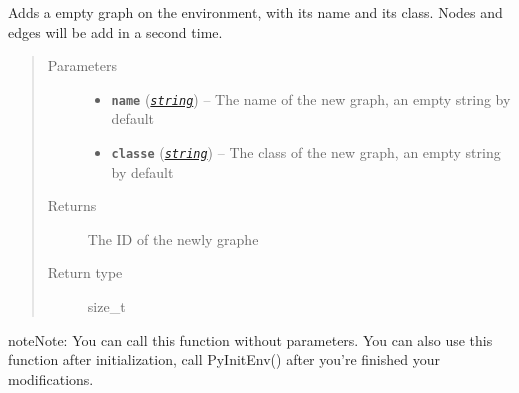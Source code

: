 \documentclass[letterpaper,10pt,english]{sphinxmanual}
\begin{document}

\begin{fulllineitems}
\label{doc:PythonGedLib.PyAddGraph}
Adds a empty graph on the environment, with its name and its class. Nodes and edges will be add in a second time.
\begin{quote}\begin{description}
\item[{Parameters}] \leavevmode\begin{itemize}
\item {} 
\textbf{\texttt{name}} (\href{https://docs.python.org/3/library/string.html\#module-string}{\emph{\texttt{string}}}) -- The name of the new graph, an empty string by default

\item {} 
\textbf{\texttt{classe}} (\href{https://docs.python.org/3/library/string.html\#module-string}{\emph{\texttt{string}}}) -- The class of the new graph, an empty string by default

\end{itemize}

\item[{Returns}] \leavevmode
The ID of the newly graphe

\item[{Return type}] \leavevmode
size\_t

\end{description}\end{quote}

\begin{notice}{note}{Note:}
You can call this function without parameters. You can also use this function after initialization, call PyInitEnv() after you're finished your modifications.
\end{notice}

\end{fulllineitems}

\end{document}
